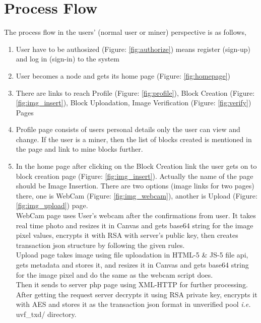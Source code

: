 \section{Process Flow}
The process flow in the users' (normal user or miner) perspective is as follows,
\begin{enumerate}
\item User have to be authosized (Figure: \ref{fig:authorize}) means register (sign-up) and log in (sign-in) to the system
\item User becomes a node and gets its home page (Figure: \ref{fig:homepage})
\item There are links to reach Profile (Figure: \ref{fig:profile}), Block Creation (Figure: \ref{fig:img_insert}), Block Uploadation, Image Verification (Figure: \ref{fig:verify}) Pages
\item Profile page consists of users personal details only the user can view and change. If the user is a miner, then the list of blocks created is mentioned in the page and link to mine blocks further.
\item In the home page after clicking on the Block Creation link the user gets on to block creation page (Figure: \ref{fig:img_insert}). Actually the name of the page should be Image Insertion. There are two options (image links for two pages) there, one is WebCam (Figure: \ref{fig:img_webcam}), another is Upload (Figure: \ref{fig:img_upload}) page. \\
WebCam page uses User's webcam after the confirmations from user. It takes real time photo and resizes it in Canvas and gets base64 string for the image pixel values, encrypts it with RSA with server's public key, then creates transaction json structure by following the given rules. \\
Upload page takes image using file uploadation in HTML-5 \& JS-5 file api, gets metadata and stores it, and resizes it in Canvas and gets base64 string for the image pixel and do the same as the webcam script does. \\
Then it sends to server php page using XML-HTTP for further processing. After getting the request server decrypts it using RSA private key, encrypts it with AES and stores it as the transaction json format in unverified pool \textit{i.e.} uvf\_txd/ directory. \\

\end{enumerate}

